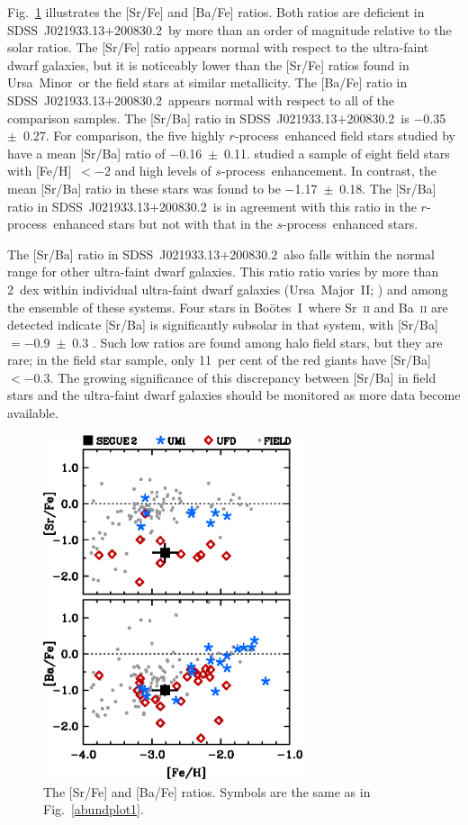 \documentclass[useAMS,usenatbib,usegraphicx]{mn2e}
\def\rpro{\mbox{$r$-process}}
\def\spro{\mbox{$s$-process}}
\def\seg{\mbox{SDSS~J021933.13$+$200830.2}}
\def\umigal{\mbox{Ursa Minor}}
\def\boogal{\mbox{Bo\"{o}tes~I}}
\def\umagal{\mbox{Ursa Major~II}}
\begin{document}
Fig.~\ref{abundplot4} illustrates the [Sr/Fe] and [Ba/Fe] ratios.
Both ratios are deficient in \seg\ by more than an order of magnitude 
relative to the solar ratios.
The [Sr/Fe] ratio appears normal with respect to the
ultra-faint dwarf galaxies, but it is noticeably lower than
the [Sr/Fe] ratios found in \umigal\ or the 
field stars at similar metallicity.
The [Ba/Fe] ratio in \seg\ appears normal with 
respect to all of the comparison samples.
The [Sr/Ba] ratio in \seg\ is $-$0.35~$\pm$~0.27.
For comparison, 
the five highly \rpro\ enhanced field stars 
studied by \citet{sneden09} have a mean [Sr/Ba]
ratio of $-$0.16~$\pm$~0.11.
\citet{aoki08} studied a sample
of eight field stars with [Fe/H]~$< -$2
and high levels of \spro\ enhancement.
In contrast, 
the mean [Sr/Ba] ratio in these stars was found to be
$-$1.17~$\pm$~0.18.
The [Sr/Ba] ratio in \seg\ is in agreement with this
ratio in the \rpro\ enhanced stars
but not with that in the \spro\ enhanced stars.

The [Sr/Ba] ratio in \seg\ also falls within
the normal range for other ultra-faint dwarf galaxies.
This ratio ratio varies by more than 2~dex within
individual ultra-faint dwarf galaxies 
(\umagal; \citealt{frebel10}) and among the ensemble of these systems.
Four stars in \boogal\ where Sr~\textsc{ii} and Ba~\textsc{ii} are detected
indicate [Sr/Ba] is significantly subsolar in that system,
with [Sr/Ba]~$= -$0.9~$\pm$~0.3 \citep{norris10b,ishigaki14}.
Such low ratios are found among halo field stars, but they are rare;
in the \citet{roederer14} field star sample, only 
11~per cent of the red giants have [Sr/Ba]~$< -$0.3.
The growing significance of this discrepancy 
between [Sr/Ba] in field stars and the ultra-faint dwarf galaxies
should be monitored as more data become available.


\begin{figure}
\centering
\includegraphics[angle=00,width=3.0in]{fig6.eps}
\caption{
\label{abundplot4}
The [Sr/Fe] and [Ba/Fe] ratios.
Symbols are the same as in Fig.~\ref{abundplot1}.
}
\end{figure}
\end{document}

